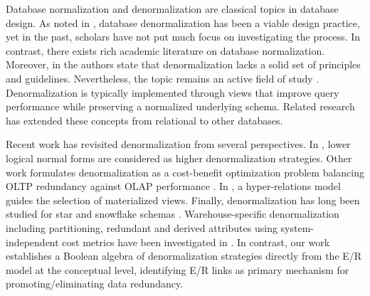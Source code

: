 \documentclass[sigconf]{acmart}
\begin{document}
Database normalization \cite{Armstrong_74_Dependency_Structures, Biskup_79_Synthesizing_Independent_DB_Schemas, Mannila_92_Relational_DB_Design, Batini_09_Encyclopedia_DBs, Abiteboul_95_Foundations_DBs} and denormalization \cite{Schkolnick_82_Effects_of_Denormalization, Sanders_01_Denormalization_Effects_RDBMS, Shin_06_Denormalization_Data_Warehouse, Lee_09_Side_Effects_Denormalization} are classical topics in database design. As noted in \cite{Shin_06_Denormalization_Data_Warehouse}, database denormalization has been a viable design practice, yet in the past, scholars have not put much focus on investigating the process. In contrast, there exists rich academic literature on database normalization. Moreover, in \cite{Shin_06_Denormalization_Data_Warehouse} the authors state that denormalization lacks a solid set of principles and guidelines. Nevertheless, the topic remains an active field of study \cite{Milicev_23_Hyper_Relations_Model_For_Denormalization, Fotache_25_Effects_of_DB_Normalization}. Denormalization is typically implemented through views that improve query performance while preserving a normalized underlying schema. Related research has extended these concepts from relational  \cite{Codd_70_Relational} to other databases\cite{Levene_99_DB_Design_Incomplete_Relations, Grahne_91_Incomplete_Information_in_Relational_DBs,Koehler_16_SQL_Schema_Design,Sanders_01_Denormalization_Effects_RDBMS,Link_19_DB_Design_Uncertain_Data,Tari_1997_Object_Normal_Form, Kemper_94_Materialization_in_Obect_Bases,Arenas_05_Normal_Forms_For_XML, Haw_11_Data_Storage_Query_Processing_XML, Skavantzos_25_3NF_BCNF_Graph, Han_25_Views_for_PGs, Pang_24_MV_Selection_And_MV_Based_Query_Planing_For_RPQs}.

Recent work has revisited denormalization from several perspectives. In \cite{Fotache_25_Effects_of_DB_Normalization}, lower logical normal forms are considered as higher denormalization strategies. Other work formulates denormalization as a cost-benefit optimization problem balancing OLTP redundancy against OLAP performance \cite{Kojic_20_Equilibrium_of_Redundancy}. In \cite{Milicev_23_Hyper_Relations_Model_For_Denormalization}, a hyper-relations model guides the selection of materialized views. Finally, denormalization has long been studied for star and snowflake schemas \cite{Inmon_05_Building_Data_Warehouse}. Warehouse-specific denormalization including partitioning, redundant and derived attributes using system-independent cost metrics \cite{Elmasri_15_Fundamentals_DB} have been investigated in \cite{Shin_06_Denormalization_Data_Warehouse}. In contrast, our work establishes a Boolean algebra of denormalization strategies directly from the E/R model at the conceptual level, identifying E/R links as primary mechanism for promoting/eliminating data redundancy.
\end{document}
